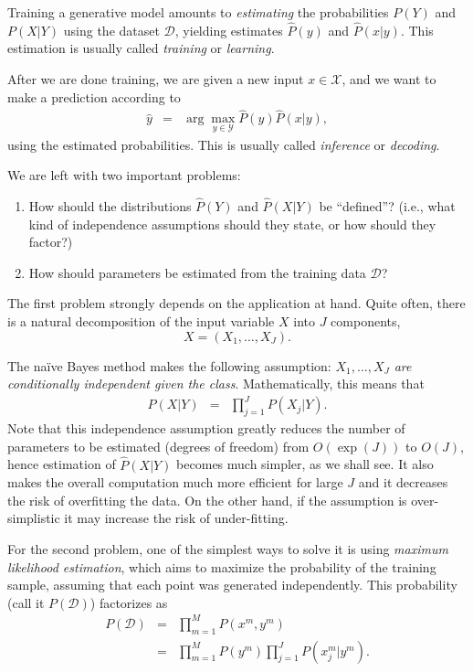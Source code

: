 Training a generative model amounts to \emph{estimating} the probabilities $P(Y)$ and $P(X|Y)$ using the dataset $\mathcal{D}$, yielding estimates 
$\hat{P}(y)$ and $\hat{P}(x|y)$. This estimation is usually called \emph{training} or \emph{learning}.

After we are done training, we are given a new input $x \in \mathcal{X}$, and we want to make a prediction according to  
\begin{eqnarray}
{\hat y} &=& \arg\max_{y \in \mathcal{Y}} \hat{P}(y) \hat{P}(x|y),
\label{eq:argmax}
\end{eqnarray}
using the estimated probabilities. This is usually called \emph{inference} or \emph{decoding}.


We are left with two important problems:
\begin{enumerate}
\item How should the distributions ${\hat P}(Y)$ and ${\hat P}(X|Y)$ be ``defined''?
(i.e., what kind of independence assumptions should they state, or how should they factor?)
\item How should parameters be estimated from the training data $\mathcal{D}$?
\end{enumerate}

The first problem strongly depends on the application at hand. Quite often, there is a natural decomposition of the input variable $X$ into $J$ components, 
\begin{equation}
X = (X_1,\ldots,X_J). 
\end{equation}

The na\"{i}ve Bayes method makes the following assumption: \emph{$X_1,\ldots,X_J$ are conditionally independent given the class}. Mathematically, this means that 
\begin{eqnarray}
P(X|Y) &=& \prod_{j=1}^J P(X_j|Y).
\end{eqnarray}
Note that this independence assumption greatly reduces the number of parameters to be estimated (degrees of freedom) 
from $O(\exp(J))$ to $O(J)$, 
hence estimation of ${\hat P}(X|Y)$ becomes much simpler, as we shall see. 
It also makes the overall computation much more efficient for large $J$ and it decreases the risk of overfitting the data. 
On the other hand, if the assumption is over-simplistic it may increase the risk 
of under-fitting. 

For the second problem, one of the simplest ways to solve it is using \emph{maximum likelihood estimation}, which aims to maximize the probability of the training sample, assuming that each point was generated independently. This probability (call it $P(\mathcal{D})$) factorizes as 
\begin{eqnarray}
P(\mathcal{D}) &=& \prod_{m=1}^M P(x^m,y^m) \nonumber\\
&=& \prod_{m=1}^M P(y^m)\prod_{j=1}^J P(x^m_j|y^m). 
\end{eqnarray}



